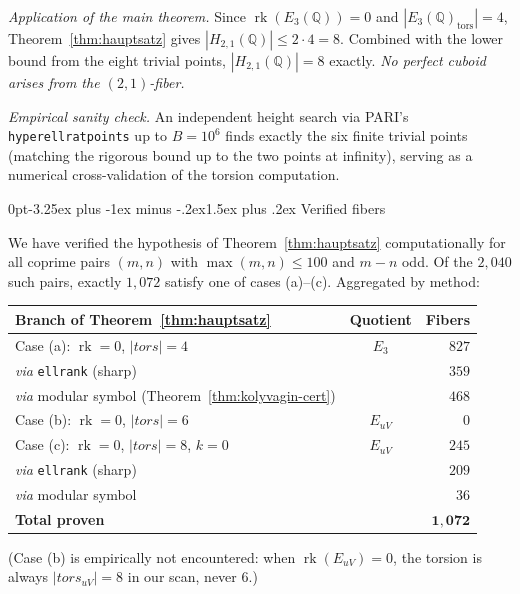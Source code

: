\documentclass[12pt,a4paper,reqno]{amsart}
\makeatletter
\renewcommand{\subsection}{\@startsection{subsection}{2}%
  {0pt}{-3.25ex plus -1ex minus -.2ex}{1.5ex plus .2ex}%
  {\normalfont\normalsize\bfseries}}
\theoremstyle{plain}
\theoremstyle{definition}
\theoremstyle{remark}
\newcommand{\Q}{\mathbb{Q}}
\newcommand{\rk}{\operatorname{rk}}
\newcommand{\tors}{\mathrm{tors}}
\makeatother
\begin{document}
\emph{Application of the main theorem.} Since $\rk(E_3(\Q)) = 0$ and $|E_3(\Q)_\tors| = 4$, Theorem~\ref{thm:hauptsatz} gives $|H_{2,1}(\Q)| \le 2 \cdot 4 = 8$. Combined with the lower bound from the eight trivial points, $|H_{2,1}(\Q)| = 8$ exactly. \emph{No perfect cuboid arises from the $(2, 1)$-fiber.}

\emph{Empirical sanity check.} An independent height search via PARI's \texttt{hyperellratpoints} up to $B = 10^6$ finds exactly the six finite trivial points (matching the rigorous bound up to the two points at infinity), serving as a numerical cross-validation of the torsion computation.

\subsection{Verified fibers}
\label{ssec:verified}

We have verified the hypothesis of Theorem~\ref{thm:hauptsatz} computationally for all coprime pairs $(m, n)$ with $\max(m, n) \le 100$ and $m - n$ odd. Of the $2{,}040$ such pairs, exactly $1{,}072$ satisfy one of cases (a)--(c). Aggregated by method:

\begin{center}
\begin{tabular}{lcr}
\toprule
Branch of Theorem~\ref{thm:hauptsatz} & Quotient & Fibers \\
\midrule
Case (a): $\rk = 0$, $|tors| = 4$  & $E_3$    & $827$ \\
\quad\textit{via} \texttt{ellrank} (sharp)  &          & $359$ \\
\quad\textit{via} modular symbol (Theorem~\ref{thm:kolyvagin-cert})        &          & $468$ \\
Case (b): $\rk = 0$, $|tors| = 6$ & $E_{uV}$ & $0$ \\
Case (c): $\rk = 0$, $|tors| = 8$, $k = 0$ & $E_{uV}$ & $245$ \\
\quad\textit{via} \texttt{ellrank} (sharp)                                                     &          & $209$ \\
\quad\textit{via} modular symbol                                          &          & $36$ \\
\midrule
\textbf{Total proven} & & $\mathbf{1{,}072}$ \\
\bottomrule
\end{tabular}
\end{center}

\noindent (Case (b) is empirically not encountered: when $\rk(E_{uV}) = 0$, the torsion is always $|tors_{uV}| = 8$ in our scan, never $6$.)
\end{document}
